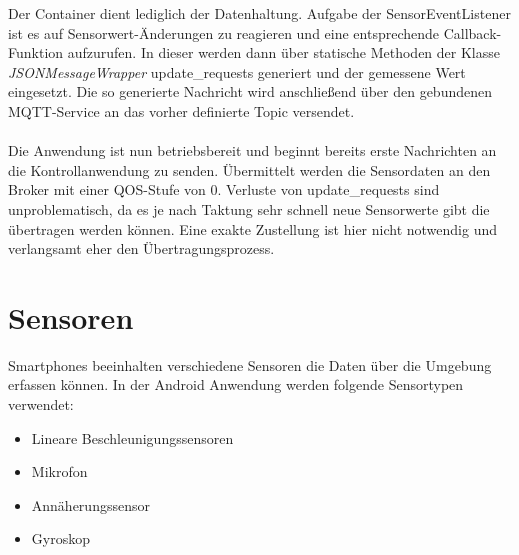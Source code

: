 \documentclass[11pt,a4paper]{report}
\begin{document}
Der Container dient lediglich der Datenhaltung.
Aufgabe der SensorEventListener ist es auf Sensorwert-Änderungen zu reagieren und eine entsprechende Callback-Funktion aufzurufen.
In dieser werden dann über statische Methoden der Klasse \textit{JSONMessageWrapper} update\_requests generiert und der gemessene Wert eingesetzt.
Die so generierte Nachricht wird anschließend über den gebundenen MQTT-Service an das vorher definierte Topic versendet.
\\\\
Die Anwendung ist nun betriebsbereit und beginnt bereits erste Nachrichten an die Kontrollanwendung zu senden.
Übermittelt werden die Sensordaten an den Broker mit einer QOS-Stufe von 0.
Verluste von update\_requests sind unproblematisch, da es je nach Taktung sehr schnell neue Sensorwerte gibt die übertragen werden können.
Eine exakte Zustellung ist hier nicht notwendig und verlangsamt eher den Übertragungsprozess.

\section{Sensoren}
Smartphones beeinhalten verschiedene Sensoren die Daten über die Umgebung erfassen können.
In der Android Anwendung werden folgende Sensortypen verwendet:
\begin{itemize}
  \item Lineare Beschleunigungssensoren
  \item Mikrofon
  \item Annäherungssensor
  \item Gyroskop
\end{itemize}
\end{document}
